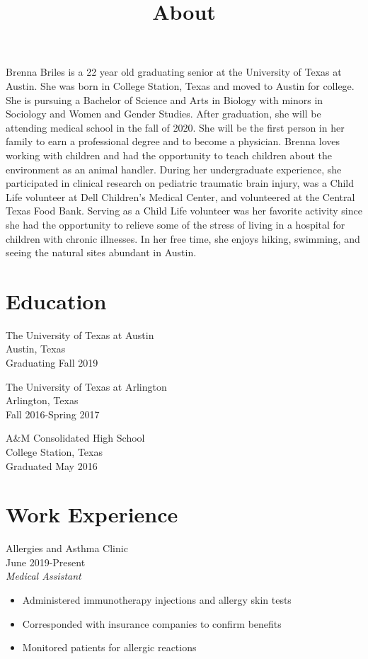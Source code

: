 \documentclass[]{article}
\title{About}
\author{}
\date{}
\providecommand{\tightlist}{%
  \setlength{\itemsep}{0pt}\setlength{\parskip}{0pt}}
\begin{document}
\maketitle

Brenna Briles is a 22 year old graduating senior at the University of
Texas at Austin. She was born in College Station, Texas and moved to
Austin for college. She is pursuing a Bachelor of Science and Arts in
Biology with minors in Sociology and Women and Gender Studies. After
graduation, she will be attending medical school in the fall of 2020.
She will be the first person in her family to earn a professional degree
and to become a physician. Brenna loves working with children and had
the opportunity to teach children about the environment as an animal
handler. During her undergraduate experience, she participated in
clinical research on pediatric traumatic brain injury, was a Child Life
volunteer at Dell Children's Medical Center, and volunteered at the
Central Texas Food Bank. Serving as a Child Life volunteer was her
favorite activity since she had the opportunity to relieve some of the
stress of living in a hospital for children with chronic illnesses. In
her free time, she enjoys hiking, swimming, and seeing the natural sites
abundant in Austin.

\section{Education}\label{education}

The University of Texas at Austin\\
Austin, Texas\\
Graduating Fall 2019

The University of Texas at Arlington\\
Arlington, Texas\\
Fall 2016-Spring 2017

A\&M Consolidated High School\\
College Station, Texas\\
Graduated May 2016

\section{Work Experience}\label{work-experience}

Allergies and Asthma Clinic\\
June 2019-Present\\
\emph{Medical Assistant}

\begin{itemize}
\tightlist
\item
  Administered immunotherapy injections and allergy skin tests\\
\item
  Corresponded with insurance companies to confirm benefits\\
\item
  Monitored patients for allergic reactions
\end{itemize}
\end{document}
